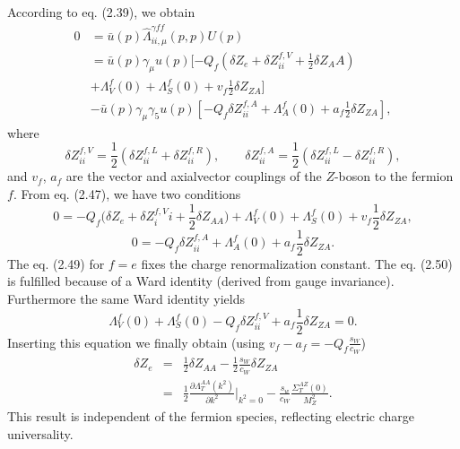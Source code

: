 According to eq. (2.39), we obtain
\begin{align}
0&=\bar{u}(p)\hat{\Lambda}^{\gamma ff}_{ii,\mu}(p,p)U(p)\nonumber\\
&=\bar{u}(p)\gamma_\mu u(p) [-Q_f(\delta Z_e+\delta Z^{f,V}_{ii}+\frac{1}{2}\delta Z_AA)\nonumber\\
&+\Lambda^f_V(0)+\Lambda^f_S(0)+v_f\frac{1}{2}\delta Z_{ZA}]\nonumber\\
&-\bar{u}(p)\gamma_\mu\gamma_5 u(p)[-Q_f\delta Z^{f,A}_{ii}+\Lambda^f_A(0)+a_f\frac{1}{2}\delta Z_{ZA}],
\end{align}
where
\begin{equation}
\delta Z^{f,V}_{ii}=\frac{1}{2}(\delta Z^{f,L}_{ii}+\delta Z^{f,R}_{ii}),\quad\quad \delta Z^{f,A}_{ii}=\frac{1}{2}(\delta Z^{f,L}_{ii}-\delta Z^{f,R}_{ii}),
\end{equation}
and $v_f$, $a_f$ are the vector and axialvector couplings of the $Z$-boson to the fermion $f$. From eq. (2.47), we have two conditions
\begin{equation}
0=-Q_f\biggl( \delta Z_e+\delta Z^{f,V}_ii+\frac{1}{2}\delta Z_{AA}  \biggr)+\Lambda^f_V(0)+\Lambda^f_S(0)+v_f\frac{1}{2}\delta Z_{ZA},
\end{equation}
\begin{equation}
0=-Q_f\delta Z^{f,A}_{ii}+\Lambda^f_A(0)+a_f\frac{1}{2}\delta Z_{ZA}.
\end{equation}
The eq. (2.49) for $f=e$ fixes the charge renormalization constant. The eq. (2.50) is fulfilled because of a Ward identity (derived from gauge invariance). Furthermore the same Ward identity yields
\begin{equation}
\Lambda^f_V(0)+\Lambda^f_S(0)-Q_f\delta Z^{f,V}_{ii}+a_f\frac{1}{2}\delta Z_{ZA}=0.
\end{equation}
Inserting this equation we finally obtain (using $v_f-a_f=-Q_f\frac{s_W}{c_W}$)
\begin{eqnarray}
\delta Z_e&=&\frac{1}{2}\delta Z_{AA}-\frac{1}{2}\frac{s_W}{c_W}\delta Z_{ZA}\nonumber\\
&=&\frac{1}{2}\frac{\partial\Lambda^{AA}_T(k^2)}{\partial k^2}|_{k^2=0}-\frac{s_w}{c_W}\frac{\Sigma^{AZ}_T(0)}{M^2_Z}.
\end{eqnarray}
This result is independent of the fermion species, reflecting electric charge universality.

